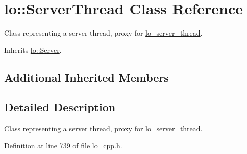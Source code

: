 \hypertarget{classlo_1_1ServerThread}{\section{lo\+:\+:Server\+Thread Class Reference}
\label{classlo_1_1ServerThread}
}


Class representing a server thread, proxy for \hyperlink{lo__types_8h_a09996ffb6bde21b8fb6106897b88feae}{lo\+\_\+server\+\_\+thread}.  




Inherits \hyperlink{classlo_1_1Server}{lo\+::\+Server}.

\subsection*{Additional Inherited Members}


\subsection{Detailed Description}
Class representing a server thread, proxy for \hyperlink{lo__types_8h_a09996ffb6bde21b8fb6106897b88feae}{lo\+\_\+server\+\_\+thread}. 

Definition at line 739 of file lo\+\_\+cpp.\+h.

